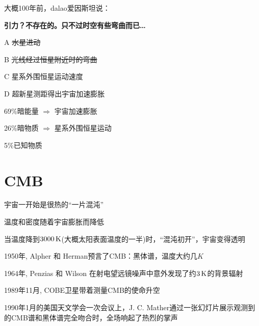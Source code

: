 \documentclass[CJK]{beamer}
\begin{document}
\begin{frame}
  \bch

  
  \emini
  大概100年前，dalao爱因斯坦说：

  \skipline
  
  {\Large \bf 引力？不存在的。只不过时空有些弯曲而已…}

  \skiplines
  
  \bitem
\item[A]{\sout{水星进动}}
\item[B]{\sout{光线经过恒星附近时的弯曲}}
\item[C]{星系外围恒星运动速度}
\item[D]{超新星测距得出宇宙加速膨胀}  
  \eitem
  \emini
  \ech
\end{frame}

\begin{frame}
  \bch
  \emini
  \bitem
\item{69\%暗能量 $\Rightarrow$ 宇宙加速膨胀}
\item{26\%暗物质 $\Rightarrow$ 星系外围恒星运动}
\item{5\%已知物质}
  \eitem
  \emini
  \ech
\end{frame}

\section{CMB}

\begin{frame}
  \bch
  \bitem
\item{宇宙一开始是很热的“一片混沌”
}
\item{温度和密度随着宇宙膨胀而降低}
\item{当温度降到$3000\,\mathrm{K}$(大概太阳表面温度的一半)时，“混沌初开”，宇宙变得透明}
  \eitem

  \ech
\end{frame}

\begin{frame}
  \bch
  \ech
\end{frame}


\begin{frame}
  \bch
  \bitem
\item{1950年, Alpher 和 Herman预言了CMB：黑体谱，温度大约几$K$}
\item{1964年, Penzias 和 Wilson 在射电望远镜噪声中意外发现了约$3\,\mathrm{K}$的背景辐射}
\item{1989年11月, COBE卫星带着测量CMB的使命升空}
\item{   \emini
  1990年1月的美国天文学会一次会议上，J. C. Mather通过一张幻灯片展示观测到的CMB谱和黑体谱完全吻合时，全场响起了热烈的掌声\emini
}  
  \eitem

  \ech
\end{frame}
\end{document}
